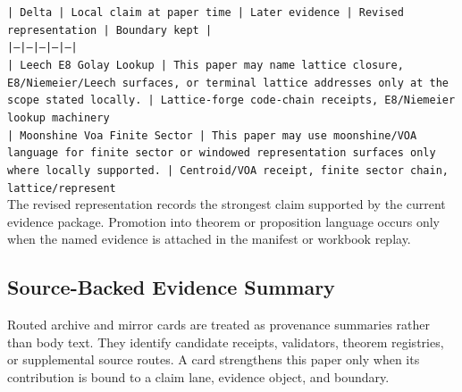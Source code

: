 \documentclass[11pt]{article}
\begin{document}
\noindent\texttt{| Delta | Local claim at paper time | Later evidence | Revised representation | Boundary kept |}\\
\noindent\texttt{|---|---|---|---|---|}\\
\noindent\texttt{| Leech E8 Golay Lookup | This paper may name lattice closure, E8/Niemeier/Leech surfaces, or terminal lattice addresses only at the scope stated locally. | Lattice-forge code-chain receipts, E8/Niemeier lookup machinery}\\
\noindent\texttt{| Moonshine Voa Finite Sector | This paper may use moonshine/VOA language for finite sector or windowed representation surfaces only where locally supported. | Centroid/VOA receipt, finite sector chain, lattice/represent}\\

The revised representation records the strongest claim supported by the current evidence package. Promotion into theorem or proposition language occurs only when the named evidence is attached in the manifest or workbook replay.

\subsection*{Source-Backed Evidence Summary}

Routed archive and mirror cards are treated as provenance summaries rather than
body text. They identify candidate receipts, validators, theorem registries, or
supplemental source routes. A card strengthens this paper only when its
contribution is bound to a claim lane, evidence object, and boundary.
\end{document}
